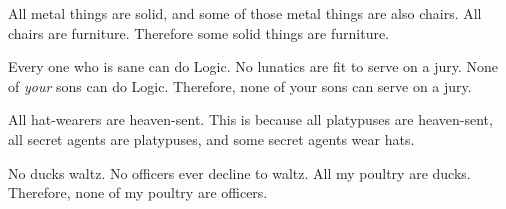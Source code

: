 \begin{exercises}

\item All metal things are solid, and some of those metal things are also chairs. All chairs are furniture. Therefore some solid things are furniture.





\item \label{itm:sons} Every one who is sane can do Logic. No lunatics are fit to serve on a jury. None of \textit{your} sons can do Logic. Therefore, none of your sons can serve on a jury.


\item All hat-wearers are heaven-sent. This is because all platypuses are heaven-sent, all secret agents are platypuses, and some secret agents wear hats.



\item \label{itm:ducks} No ducks waltz. No officers ever decline to waltz. All my poultry are ducks. Therefore, none of my poultry are officers.





\end{exercises}
